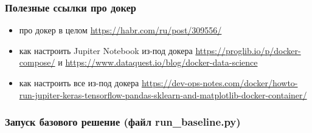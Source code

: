 \subsubsection*{Полезные ссылки про докер }

\begin{itemize}
    \item про докер в целом \url{https://habr.com/ru/post/309556/} 
    \item как настроить Jupiter Notebook из-под докера \url{https://proglib.io/p/docker-compose/} и \url{https://www.dataquest.io/blog/docker-data-science}
    \item как настроить все из-под докера \url{https://dev-ops-notes.com/docker/howto-run-jupiter-keras-tensorflow-pandas-sklearn-and-matplotlib-docker}\linebreak \url{-container/}        
\end{itemize}

\subsubsection*{Запуск базового решение (файл run\_baseline.py)}

